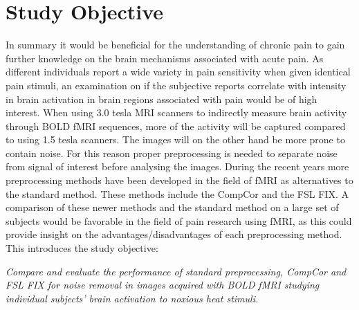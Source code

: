 \chapter{Study Objective}

In summary it would be beneficial for the understanding of chronic pain to gain further knowledge on the brain mechanisms associated with acute pain. As different individuals report a wide variety in pain sensitivity when given identical pain stimuli, an examination on if the subjective reports correlate with intensity in brain activation in brain regions associated with pain would be of high interest. When using 3.0 tesla MRI scanners to indirectly measure brain activity through BOLD fMRI sequences, more of the activity will be captured compared to using 1.5 tesla scanners. The images will on the other hand be more prone to contain noise. For this reason proper preprocessing is needed to separate noise from signal of interest before analysing the images. During the recent years more preprocessing methods have been developed in the field of fMRI as alternatives to the standard method. These methods include the CompCor and the FSL FIX. A comparison of these newer methods and the standard method on a large set of subjects would be favorable in the field of pain research using fMRI, as this could provide insight on the advantages/disadvantages of each preprocessing method. This introduces the study objective:

\begin{center}

\textit{Compare and evaluate the performance of standard preprocessing, CompCor and FSL FIX for noise removal in images acquired with BOLD fMRI studying individual subjects' brain activation to noxious heat stimuli.}

\end{center}